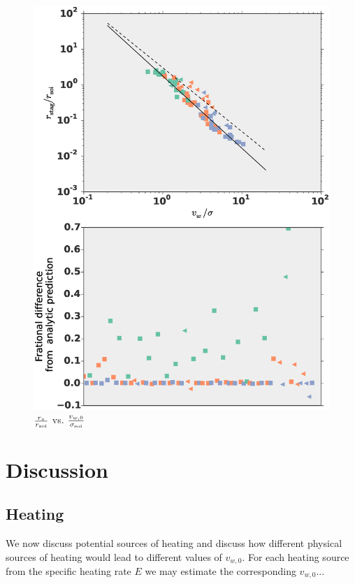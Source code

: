 \documentclass[usenatbib,fleqn]{mn2e}
\newcommand{\soi}{\rm soi}
\newcommand{\rsoi}{r_{\soi}}
\newcommand{\sigsoi}{\sigma_{\soi}}
\newcommand{\vwO}{v_{w,0}}
\newcommand{\x}{\frac{r_s}{\rsoi}}
\newcommand{\vwNorm}{\frac{\vwO}{\sigsoi}}
\begin{document}
\begin{figure}
\includegraphics[width=\columnwidth]{rs.eps}
\caption{\label{fig:stag}$\x$ vs. $\vwNorm$}
\end{figure}


\section{Discussion}
\subsection{Heating}
We now discuss potential sources of heating and discuss how different physical sources of heating would lead to different values of $\vwO$. For each heating source  from the specific heating rate $E$ we may estimate the corresponding $\vwO$...
\end{document}
